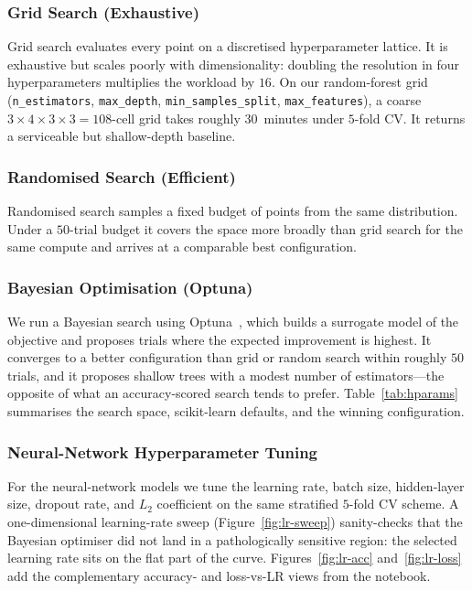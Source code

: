 \documentclass[pdflatex,sn-basic,Numbered]{sn-jnl}
\theoremstyle{thmstyleone}
\theoremstyle{thmstyletwo}
\theoremstyle{thmstylethree}
\begin{document}
\subsubsection{Grid Search (Exhaustive)}
Grid search evaluates every point on a discretised hyperparameter
lattice. It is exhaustive but scales poorly with dimensionality: doubling
the resolution in four hyperparameters multiplies the workload by $16$.
On our random-forest grid (\texttt{n\_estimators}, \texttt{max\_depth},
\texttt{min\_samples\_split}, \texttt{max\_features}), a coarse
$3{\times}4{\times}3{\times}3 = 108$-cell grid takes roughly $30$~minutes
under $5$-fold CV. It returns a serviceable but shallow-depth baseline.

\subsubsection{Randomised Search (Efficient)}
Randomised search samples a fixed budget of points from the same
distribution. Under a $50$-trial budget it covers the space more
broadly than grid search for the same compute and arrives at a
comparable best configuration.

\subsubsection{Bayesian Optimisation (Optuna)}
We run a Bayesian search using Optuna~\cite{optuna}, which builds a
surrogate model of the objective and proposes trials where the expected
improvement is highest. It converges to a better configuration than grid
or random search within roughly $50$ trials, and it proposes shallow
trees with a modest number of estimators---the opposite of what an
accuracy-scored search tends to prefer. Table~\ref{tab:hparams}
summarises the search space, scikit-learn defaults, and the winning
configuration.

\subsubsection{Neural-Network Hyperparameter Tuning}
For the neural-network models we tune the learning rate, batch size,
hidden-layer size, dropout rate, and $L_2$ coefficient on the same
stratified $5$-fold CV scheme. A one-dimensional learning-rate sweep
(Figure~\ref{fig:lr-sweep}) sanity-checks that the Bayesian optimiser did
not land in a pathologically sensitive region: the selected learning
rate sits on the flat part of the curve. Figures~\ref{fig:lr-acc}
and~\ref{fig:lr-loss} add the complementary accuracy- and loss-vs-LR
views from the notebook.
\end{document}
